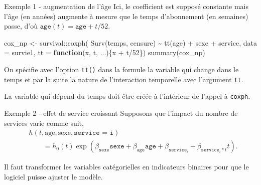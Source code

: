 \documentclass[
  ignorenonframetext,
]{beamer}
\newenvironment{Shaded}{\begin{snugshade}}{\end{snugshade}}
\newcommand{\AttributeTok}[1]{\textcolor[rgb]{0.40,0.45,0.13}{#1}}
\newcommand{\ControlFlowTok}[1]{\textcolor[rgb]{0.00,0.23,0.31}{\textbf{#1}}}
\newcommand{\DecValTok}[1]{\textcolor[rgb]{0.68,0.00,0.00}{#1}}
\newcommand{\FunctionTok}[1]{\textcolor[rgb]{0.28,0.35,0.67}{#1}}
\newcommand{\NormalTok}[1]{\textcolor[rgb]{0.00,0.23,0.31}{#1}}
\newcommand{\OtherTok}[1]{\textcolor[rgb]{0.00,0.23,0.31}{#1}}
\newcommand{\SpecialCharTok}[1]{\textcolor[rgb]{0.37,0.37,0.37}{#1}}
\begin{document}
\begin{frame}[fragile]{Exemple 1 - augmentation de l'âge}
\protect{}\label{exemple-1---augmentation-de-luxe2ge}
Ici, le coefficient est supposé constante mais l'âge (en années)
augmente à mesure que le temps d'abonnement (en semaines) passe, d'où
\(\texttt{age}(t) = \texttt{age} + t/52\).

\begin{Shaded}
\begin{Highlighting}[numbers=left,,]
\NormalTok{cox\_np }\OtherTok{\textless{}{-}}\NormalTok{ survival}\SpecialCharTok{::}\FunctionTok{coxph}\NormalTok{(}
    \FunctionTok{Surv}\NormalTok{(temps, censure) }\SpecialCharTok{\textasciitilde{}} 
     \FunctionTok{tt}\NormalTok{(age) }\SpecialCharTok{+}\NormalTok{ sexe }\SpecialCharTok{+}\NormalTok{ service, }
     \AttributeTok{data =}\NormalTok{ survie1, }
     \AttributeTok{tt =} \ControlFlowTok{function}\NormalTok{(x, t, ...)\{x }\SpecialCharTok{+}\NormalTok{ t}\SpecialCharTok{/}\DecValTok{52}\NormalTok{\})}
\FunctionTok{summary}\NormalTok{(cox\_np)}
\end{Highlighting}
\end{Shaded}

\footnotesize

On spécifie avec l'option \texttt{tt()} dans la formule la variable qui
change dans le temps et par la suite la nature de l'interaction
temporelle avec l'argument \texttt{tt}.

La variable qui dépend du temps doit être créée à l'intérieur de l'appel
à \texttt{coxph}.
\end{frame}

\begin{frame}{Exemple 2 - effet de service croissant}
\protect{}\label{exemple-2---effet-de-service-croissant}
Supposons que l'impact du nombre de services varie comme suit,
\begin{align*}
&h(t, \text{age}, \text{sexe}, \texttt{service = i}) \\ &\qquad = h_0(t)\exp(\beta_{\texttt{sexe}}\texttt{sexe} + \beta_{\texttt{age}} \texttt{age} + \beta_{\texttt{service}_i} + \beta_{\texttt{service}_i*t}t).
\end{align*}

Il faut transformer les variables catégorielles en indicateurs binaires
pour que le logiciel puisse ajuster le modèle.
\end{frame}
\end{document}
